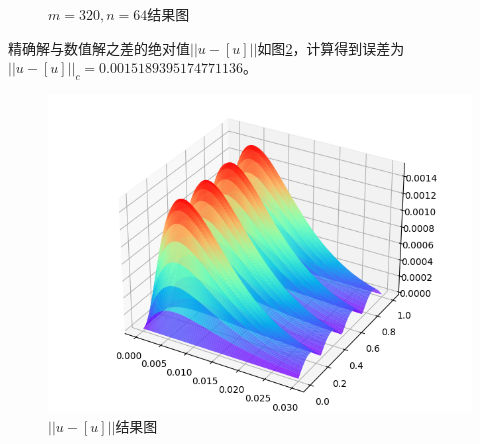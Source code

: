 \documentclass{ctexart}
\begin{document}
\begin{figure}[H]
\centering  %
\caption{$m=320,n=64$结果图}
\label{Fig.main}
\end{figure}

精确解与数值解之差的绝对值$||u-[u]||$如图\ref{Fig.main2}，计算得到误差为
$||u-[u]||_c=0.0015189395174771136$。
\begin{figure}[H] %
    \centering %
    \includegraphics[width=1\textwidth]{abs_error.png} %
    \caption{$||u-[u]||$结果图} %
    \label{Fig.main2} %
\end{figure}
\end{document}

